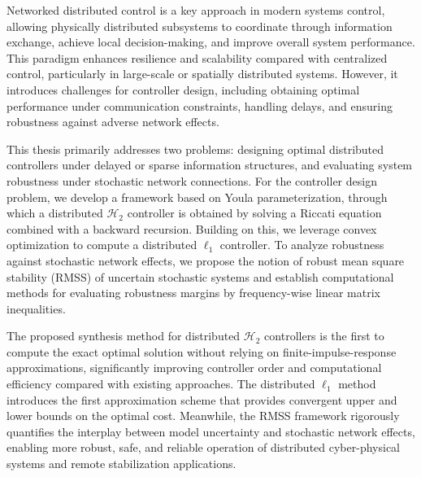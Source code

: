 Networked distributed control is a key approach in modern systems control, allowing physically distributed subsystems to coordinate through information exchange, achieve local decision-making, and improve overall system performance. This paradigm enhances resilience and scalability compared with centralized control, particularly in large-scale or spatially distributed systems. However, it introduces challenges for controller design, including obtaining optimal performance under communication constraints, handling delays, and ensuring robustness against adverse network effects.

This thesis primarily addresses two problems: designing optimal distributed controllers under delayed or sparse information structures, 
and evaluating system robustness under stochastic network connections. 
For the controller design problem, we develop a framework based on Youla parameterization, through which a distributed $\mathcal{H}_2$ controller is obtained by solving a Riccati equation combined with a backward recursion. 
Building on this, we leverage convex optimization to compute a distributed $\ell_1$ controller. 
To analyze robustness against stochastic network effects, we propose the notion of robust mean square stability (RMSS) of uncertain stochastic systems and establish computational methods for evaluating robustness margins by frequency-wise linear matrix inequalities.

The proposed synthesis method for distributed $\mathcal{H}_2$ controllers is the first to compute the exact optimal solution without relying on finite-impulse-response approximations, significantly improving controller order and computational efficiency compared with existing approaches. 
The distributed $\ell_1$ method introduces the first approximation scheme that provides convergent upper and lower bounds on the optimal cost. Meanwhile, the RMSS framework rigorously quantifies the interplay between model uncertainty and stochastic network effects, enabling more robust, safe, and reliable operation of distributed cyber-physical systems and remote stabilization applications.


